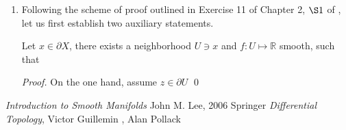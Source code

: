 \documentclass[8pt]{article} %
\begin{document}
\begin{enumerate}[label=\bfseries \arabic*.]
{		Finally, $V_n^k\subset\mathbb{R}^{kn}$ is compact as it is the subset of euclidean space which is both closed and bounded. It is closed, as
		$V_n^k=F^{-1}(\left\{I\right\})$ with $F$ being smooth (and hence continuous) and $\left\{I\right\}\subset\mathbb{R}^{k\times k}$ being closed
		as a singleton, and hence $V_n^k$ is the preimage of a closed set under smooth map, hence closed. To see that it is bounded, we consider the standard
		2-norm on $\mathbb{R}^{kn}$ (when treated as set of vectors, not matrices)
		and note that for arbitrary $A\in V_n^k$ we have $\mynorm{A}^2=\sum_{i=1}^k\mynorm{v_i}_2^2=k$ and hence 2-norm of all members of $V_n^k$ is uniformly
		bounded.
		}
		\item{Following the scheme of proof outlined in Exercise 11 of Chapter 2, $\S1$ of \cite{gp}, let us first establish two auxiliary statements.
			\begin{proposition}Let $x\in\partial X$, there exists a neighborhood $U\ni x$ and $f:U\mapsto\mathbb{R}$ smooth, such that

		\end{proposition}
		\begin{proof}
			On the one hand, assume $z\in\partial U$ 
		\qed\end{proof}
			}
\end{enumerate}
\begin{thebibliography}{9}
	 {\em Introduction to Smooth Manifolds} John M. Lee, 2006 Springer
	 {\em Differential Topology}, Victor Guillemin , Alan Pollack
\end{thebibliography}
\end{document}
